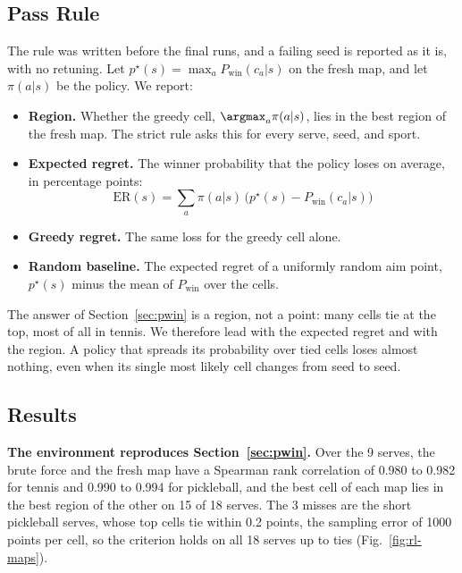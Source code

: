   \subsection{Pass Rule}\label{sec:pass}

  The rule was written before the final runs, and a failing seed is reported as
  it is, with no retuning. Let $p^\star(s) = \max_a P_{\mathrm{win}}(c_a | s)$
  on the fresh map, and let $\pi(a | s)$ be the policy. We report:

  \begin{itemize}
    \item \textbf{Region.} Whether the greedy cell, $\argmax_a \pi(a | s)$, lies
    in the best region of the fresh map. The strict rule asks this for every
    serve, seed, and sport.

    \item \textbf{Expected regret.} The winner probability that the policy loses
    on average, in percentage points:
    \begin{equation}
    \mathrm{ER}(s) = \sum_a \pi(a | s) \,
    \big( p^\star(s) - P_{\mathrm{win}}(c_a | s) \big)
    \end{equation}

    \item \textbf{Greedy regret.} The same loss for the greedy cell alone.

    \item \textbf{Random baseline.} The expected regret of a uniformly random aim
    point, $p^\star(s)$ minus the mean of $P_{\mathrm{win}}$ over the cells.
  \end{itemize}

  The answer of Section~\ref{sec:pwin} is a region, not a point: many cells tie
  at the top, most of all in tennis. We therefore lead with the expected regret
  and with the region. A policy that spreads its probability over tied cells
  loses almost nothing, even when its single most likely cell changes from seed
  to seed.

  \subsection{Results}\label{sec:results}

  \textbf{The environment reproduces Section~\ref{sec:pwin}.} Over the 9 serves,
  the brute force and the fresh map have a Spearman rank correlation of 0.980
  to 0.982 for tennis and 0.990 to 0.994 for pickleball, and the best cell of
  each map lies in the best region of the other on 15 of 18 serves. The 3
  misses are the short pickleball serves, whose top cells tie within 0.2
  points, the sampling error of 1000 points per cell, so the criterion holds on
  all 18 serves up to ties (Fig.~\ref{fig:rl-maps}).

